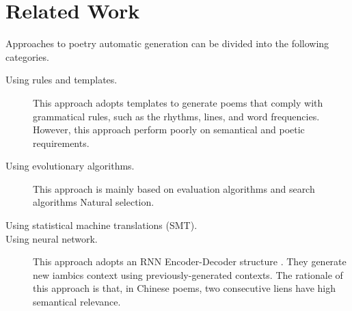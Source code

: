 \section{Related Work}  
Approaches to poetry automatic generation can be divided into the following categories.
\begin{description}
\item [Using rules and templates.] 
%
This approach adopts templates to generate poems that comply with grammatical rules, such as the rhythms, lines, and word frequencies\cite{wu2009new,tosa2008hitch}. 
%
However, this approach perform poorly on semantical and poetic requirements.
\item [Using evolutionary algorithms.] This approach is mainly based on evaluation algorithms and search algorithms
%
Natural selection.
\item [Using statistical machine translations (SMT).] 
\item [Using neural network.]  This approach adopts an RNN Encoder-Decoder structure \cite{wang2016chinese,bahdanau2014neural}. 
%
They generate new iambics context using previously-generated contexts. The rationale of this approach is that, in Chinese poems, two consecutive liens have high semantical relevance.
\end{description}
